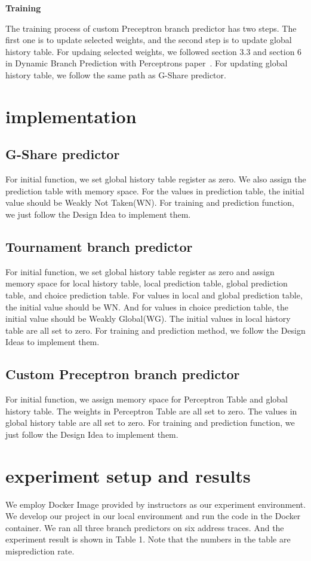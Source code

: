 \documentclass[conference]{IEEEtran}
\begin{document}
\begin{center}
  \textbf{Training}
\end{center}
The training process of custom Preceptron branch predictor has two steps. The first one is to update selected weights, and the second step is to update global history table. For updaing selected weights, we followed section 3.3 and section 6 in Dynamic Branch Prediction with Perceptrons paper~\cite{nicepaper4}. 
For updating global history table, we follow the same path as G-Share predictor. 

\section{implementation}
\subsection{G-Share predictor}
For initial function, we set global history table register as zero. We also assign the prediction table with memory space. For the values in prediction table, the initial value should be Weakly Not Taken(WN). For training and prediction function, we just follow the Design Idea to implement them. 
\subsection{Tournament branch predictor}
For initial function, we set global history table register as zero and assign memory space for local history table, local prediction table, global prediction table, and choice prediction table.
For values in local and global prediction table, the initial value should be WN. And for values in choice prediction table, the initial value should be Weakly Global(WG). The initial values in local history table
 are all set to zero. For training and prediction method, we follow the Design Ideas to implement them. 
\subsection{Custom Preceptron branch predictor}
For initial function, we assign memory space for Perceptron Table and global history table. The weights in Perceptron Table are all set to zero. The values in global history table are all set to zero. For training and prediction function, we just follow the Design Idea to implement them.
\section{experiment setup and results}
We employ Docker Image provided by instructors as our experiment environment. We develop our project in our local environment and run the code in the Docker container. We ran all three branch predictors on six address traces. And
the experiment result is shown in Table 1. Note that the numbers in the table are misprediction rate. 
\end{document}
